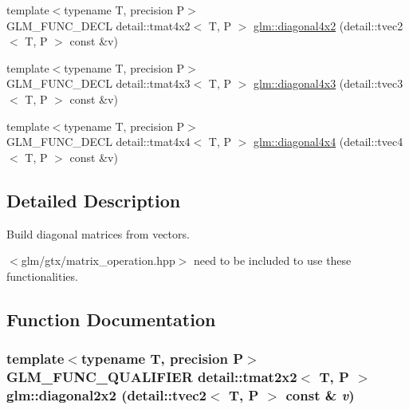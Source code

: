 \begin{CompactItemize}
\item 
{\footnotesize template$<$typename T, precision P$>$ }\\GLM\_\-FUNC\_\-DECL detail::tmat4x2$<$ T, P $>$ \hyperlink{group__gtx__matrix__operation_ge32f9a70411084d4b33464c23b04c997}{glm::diagonal4x2} (detail::tvec2$<$ T, P $>$ const \&v)
\item 
{\footnotesize template$<$typename T, precision P$>$ }\\GLM\_\-FUNC\_\-DECL detail::tmat4x3$<$ T, P $>$ \hyperlink{group__gtx__matrix__operation_g9b918f5e6a6224398447d2c79861d8fd}{glm::diagonal4x3} (detail::tvec3$<$ T, P $>$ const \&v)
\item 
{\footnotesize template$<$typename T, precision P$>$ }\\GLM\_\-FUNC\_\-DECL detail::tmat4x4$<$ T, P $>$ \hyperlink{group__gtx__matrix__operation_g32c8da8ef592e0c0891d1593ffb524db}{glm::diagonal4x4} (detail::tvec4$<$ T, P $>$ const \&v)
\end{CompactItemize}


\subsection{Detailed Description}
Build diagonal matrices from vectors. 

$<$glm/gtx/matrix\_\-operation.hpp$>$ need to be included to use these functionalities. 

\subsection{Function Documentation}
\hypertarget{group__gtx__matrix__operation_g8f6e3292b609cd9d959446d808ca3746}{
\subsubsection[diagonal2x2]{\setlength{\rightskip}{0pt plus 5cm}template$<$typename T, precision P$>$ GLM\_\-FUNC\_\-QUALIFIER detail::tmat2x2$<$ T, P $>$ glm::diagonal2x2 (detail::tvec2$<$ T, P $>$ const \& {\em v})}}
\label{group__gtx__matrix__operation_g8f6e3292b609cd9d959446d808ca3746}


